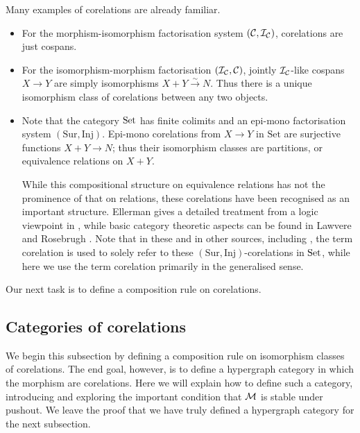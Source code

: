 \begin{examples} \label{ex.corels}
  Many examples of corelations are already familiar.
  \begin{itemize}
    \item For the morphism-isomorphism factorisation system $(\mathcal C,\mathcal I_{\mathcal
      C})$, corelations are just cospans.

    \item For the isomorphism-morphism factorisation $(\mathcal I_{\mathcal C}, \mathcal C)$,
      jointly $\mathcal I_{\mathcal C}$-like cospans $X \to Y$ are simply isomorphisms
      $X+Y \stackrel\sim\to N$. Thus there is a unique isomorphism class of
      corelations between any two objects.

    \item Note that the category $\mathrm{Set}$ has finite colimits and an epi-mono
      factorisation system $(\mathrm{Sur},\mathrm{Inj})$. Epi-mono corelations
      from $X \to Y$ in $\mathrm{Set}$ are surjective functions $X+Y \to N$;
      thus their isomorphism classes are partitions, or equivalence relations on
      $X+Y$. 

      While this compositional structure on equivalence relations has not the
      prominence of that on relations, these corelations have been recognised as
      an important structure. Ellerman gives a detailed treatment from a logic
      viewpoint in \cite{Ell14}, while basic category theoretic aspects can be
      found in Lawvere and Rosebrugh \cite{LR}.  Note that in these and in other
      sources, including \cite{CF,BF}, the term corelation is used to solely
      refer to these $(\mathrm{Sur},\mathrm{Inj})$-corelations in $\mathrm{Set}$, while
      here we use the term corelation primarily in the generalised sense.
  \end{itemize}
\end{examples}

Our next task is to define a composition rule on corelations.

\subsection{Categories of corelations} \label{ssec.corelcats}
We begin this subsection by defining a composition rule on isomorphism classes
of corelations. The end goal, however, is to define a hypergraph category in
which the morphism are corelations. Here we will explain how to define such a
category, introducing and exploring the important condition that $\mathcal M$ is
stable under pushout. We leave the proof that we have truly defined a hypergraph
category for the next subsection.

